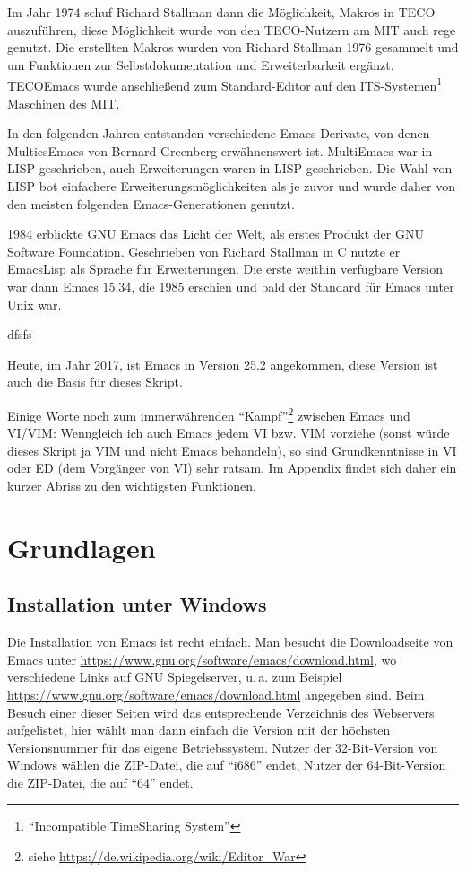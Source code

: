 \documentclass[12pt,ngerman]{scrbook}
\begin{document}
Im Jahr 1974 schuf Richard Stallman dann die Möglichkeit, Makros in TECO auszuführen, diese Möglichkeit wurde von den TECO-Nutzern am MIT auch rege genutzt. 
Die erstellten Makros wurden von Richard Stallman 1976 gesammelt und um Funktionen zur Selbstdokumentation und Erweiterbarkeit ergänzt. 
TECOEmacs wurde anschließend zum Standard-Editor auf den ITS-Systemen\footnote{\enquote{Incompatible TimeSharing System}} Maschinen des MIT.

In den folgenden Jahren entstanden verschiedene Emacs-Derivate, von denen MulticsEmacs von Bernard Greenberg erwähnenswert ist.
MultiEmacs war in LISP geschrieben, auch Erweiterungen waren in LISP geschrieben. Die Wahl von LISP bot einfachere Erweiterungsmöglichkeiten als je zuvor und wurde daher von den meisten folgenden Emacs-Generationen genutzt. 

1984 erblickte GNU Emacs das Licht der Welt, als erstes Produkt der GNU Software Foundation. 
Geschrieben von Richard Stallman in C nutzte er EmacsLisp als Sprache für Erweiterungen.
Die erste weithin verfügbare Version war dann Emacs 15.34, die 1985 erschien und bald der Standard für Emacs unter Unix war.

\begin{tcolorbox}[title={Wissen: Richard Stallman und die GNU Foundation},arc=0pt]
dfsfs

\end{tcolorbox}


Heute, im Jahr 2017, ist Emacs in Version 25.2 angekommen, diese Version ist auch die Basis für dieses Skript.

Einige Worte noch zum immerwährenden \enquote{Kampf}\footnote{siehe \url{https://de.wikipedia.org/wiki/Editor_War}} zwischen Emacs und VI/VIM: Wenngleich ich auch Emacs jedem VI bzw. VIM vorziehe (sonst würde dieses Skript ja VIM und nicht Emacs behandeln), so sind Grundkenntnisse in VI oder ED (dem Vorgänger von VI) sehr ratsam. 
Im Appendix findet sich daher ein kurzer Abriss zu den wichtigsten Funktionen.

\chapter{Grundlagen}

\section{Installation unter Windows}

Die Installation von Emacs ist recht einfach. Man besucht die Downloadseite von Emacs unter \url{https://www.gnu.org/software/emacs/download.html}, wo verschiedene Links auf GNU Spiegelserver, u.\,a. zum Beispiel \url{https://www.gnu.org/software/emacs/download.html} angegeben sind. 
Beim Besuch einer dieser Seiten wird das entsprechende Verzeichnis des Webservers aufgelistet, hier wählt man dann einfach die Version mit der höchsten Versionsnummer für das eigene Betriebssystem. 
Nutzer der 32-Bit-Version von Windows wählen die ZIP-Datei, die auf \enquote{i686} endet, Nutzer der 64-Bit-Version die ZIP-Datei, die auf \enquote{64} endet.
\end{document}
